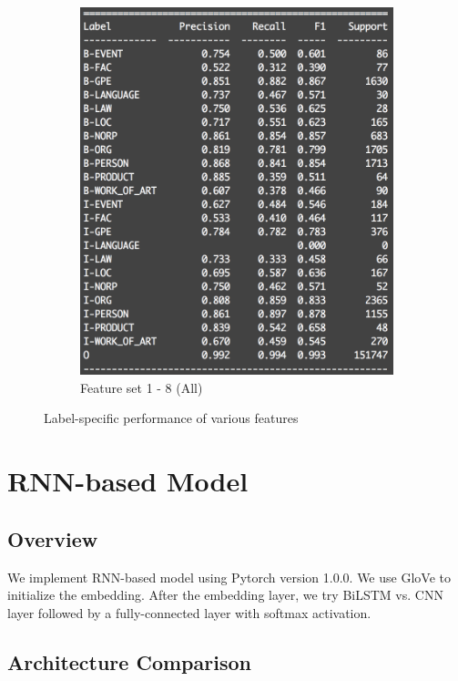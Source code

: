 \documentclass[a4paper]{article}
\begin{document}
\begin{spacing}{1.5}
\begin{figure}[t!]
\begin{subfigure}[t]{0.48\textwidth}
      \includegraphics[width=\linewidth]{log_all_feature}
      \caption{Feature set 1 - 8 (All)}
    \end{subfigure}
    \caption{Label-specific performance of various features}
    \label{fig:label_specific_performance}
  \end{figure}
  
  
  \section{RNN-based Model}
  \subsection{Overview}
  We implement RNN-based model using Pytorch version 1.0.0. We use GloVe \cite{glove} to initialize the embedding. After the embedding layer, we try BiLSTM vs. CNN layer followed by a fully-connected layer with softmax activation.
  
  \subsection{Architecture Comparison}

\end{spacing}
\end{document}
